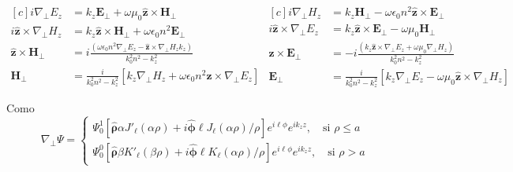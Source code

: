 \begin{equation*}
\begin{aligned}[c]
	 i\nabla_\perp E_z &= k_z\textbf{E}_\perp +\omega \mu_0 \hat{\textbf{z}} \times \textbf{H}_\perp  
	 	  	 \\
	 	  	i\hat{\textbf{z}} \times \nabla_\perp H_z &= k_z \hat{\textbf{z}} \times\textbf{H}_\perp + \omega\epsilon_0 n^2 \textbf{E}_\perp
	 \\
	  \hat{\textbf{z}} \times \textbf{H}_\perp &= i\frac{(\omega\epsilon_0 n^2 \nabla_\perp E_z  - \hat{\textbf{z}} \times \nabla_\perp H_z k_z)}{k_0^2 n^2 - k_z^2}
	  \\
	  	 \textbf{H}_\perp &= \frac{i}{k_0^2 n^2 - k_z^2}[k_z\nabla_\perp H_z + \omega \epsilon_0 n^2\hat{\textbf{z}} \times \nabla_\perp E_z]
\end{aligned}
\begin{aligned}[c]
	i \nabla_\perp H_z &= k_z \textbf{H}_\perp - \omega \epsilon_0 n^2  \hat{\textbf{z}} \times \textbf{E}_\perp 
	\\
	i\hat{\textbf{z}} \times\nabla_\perp E_z &= k_z  \hat{\textbf{z}} \times \textbf{E}_\perp - \omega \mu_0 \textbf{H}_\perp
	\\
	\hat{\textbf{z}} \times \textbf{E}_\perp &= -i\frac{(k_z\hat{\textbf{z}} \times \nabla_\perp E_z + \omega\mu_0 \nabla_\perp H_z)  }{k_0^2 n^2 - k_z^2}
	\\
	\textbf{E}_\perp &= \frac{i}{k_0^2 n^2 - k_z^2}[k_z \nabla_\perp E_z - \omega\mu_0 \hat{\textbf{z}} \times \nabla_\perp H_z]
\end{aligned}
\end{equation*}

Como 
\begin{equation*}
	\nabla_\perp \Psi =
	\left\{	
	\begin{matrix}
		\Psi_0^1\left[\boldsymbol{\hat{\rho}}\alpha J'_\ell (\alpha \rho) + i \boldsymbol{\hat{\phi}} \ell J_\ell (\alpha \rho)/\rho\right] e^{i\ell\phi} e^{i k_z z}, \quad \text{si } \rho \le a  
		\\
		\Psi_0^0\left[\boldsymbol{\hat{\rho}}\beta K'_\ell (\beta\rho) +i \boldsymbol{\hat{\phi}}\ell K_\ell (\alpha \rho)/\rho \right]e^{i\ell\phi} e^{i k_z z} , \quad \text{si } \rho > a  
	\end{matrix}
	\right.
\end{equation*}

